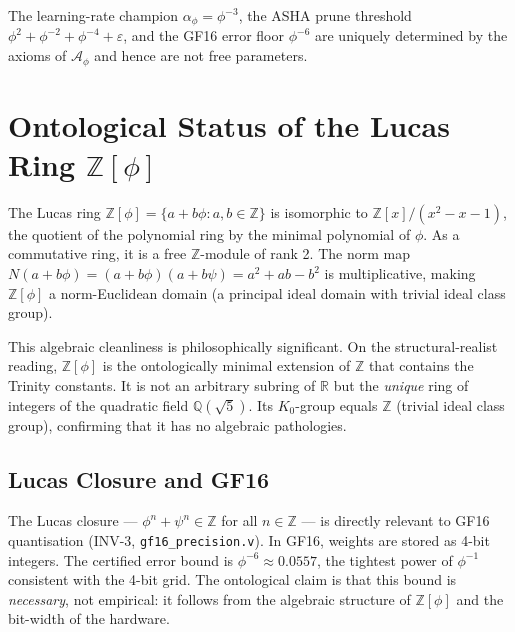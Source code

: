 \begin{corollary}
\label{cor:unique-const-31}
The learning-rate champion \(\alpha_\phi = \phi^{-3}\), the ASHA prune threshold
\(\phi^2 + \phi^{-2} + \phi^{-4} + \varepsilon\), and the GF16 error floor
\(\phi^{-6}\) are uniquely determined by the axioms of \(\mathcal{A}_\phi\)
and hence are not free parameters.
\end{corollary}

\section{Ontological Status of the Lucas Ring \(\mathbb{Z}[\phi]\)}
\label{sec:phd31-lucas-ring}

The Lucas ring \(\mathbb{Z}[\phi] = \{a + b\phi : a, b \in \mathbb{Z}\}\) is
isomorphic to \(\mathbb{Z}[x]/(x^2 - x - 1)\), the quotient of the polynomial
ring by the minimal polynomial of \(\phi\).  As a commutative ring, it is a
free \(\mathbb{Z}\)-module of rank 2.  The norm map
\(N(a + b\phi) = (a + b\phi)(a + b\psi) = a^2 + ab - b^2\) is multiplicative,
making \(\mathbb{Z}[\phi]\) a norm-Euclidean domain (a principal ideal domain
with trivial ideal class group).

This algebraic cleanliness is philosophically significant.  On the structural-realist
reading, \(\mathbb{Z}[\phi]\) is the ontologically minimal extension of
\(\mathbb{Z}\) that contains the Trinity constants.  It is not an arbitrary
subring of \(\mathbb{R}\) but the \emph{unique} ring of integers of the
quadratic field \(\mathbb{Q}(\sqrt{5})\).  Its \(K_0\)-group equals
\(\mathbb{Z}\) (trivial ideal class group), confirming that it has no
algebraic pathologies.

\subsection{Lucas Closure and GF16}

The Lucas closure — \(\phi^n + \psi^n \in \mathbb{Z}\) for all \(n \in \mathbb{Z}\)
— is directly relevant to GF16 quantisation (INV-3,
\texttt{gf16\_precision.v}).  In GF16, weights are stored as 4-bit integers.
The certified error bound is \(\phi^{-6} \approx 0.0557\), the tightest
power of \(\phi^{-1}\) consistent with the 4-bit grid.  The ontological
claim is that this bound is \emph{necessary}, not empirical: it follows from
the algebraic structure of \(\mathbb{Z}[\phi]\) and the bit-width of the
hardware.

